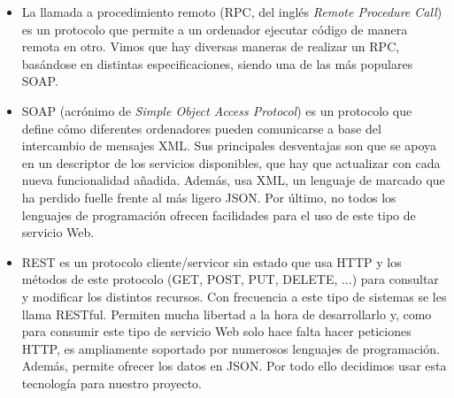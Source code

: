 \begin{itemize}
\item
La llamada a procedimiento remoto (RPC, del inglés \emph{Remote Procedure Call}) es un protocolo que permite a un ordenador ejecutar código de manera remota en otro. Vimos que hay diversas maneras de realizar un RPC, basándose en distintas especificaciones, siendo una de las más populares SOAP.

\item
SOAP (acrónimo de \emph{Simple Object Access Protocol}) es un protocolo que define cómo diferentes ordenadores pueden comunicarse a base del intercambio de mensajes XML. Sus principales desventajas son que se apoya en un descriptor de los servicios disponibles, que hay que actualizar con cada nueva funcionalidad añadida. Además, usa XML, un lenguaje de marcado que ha perdido fuelle frente al más ligero JSON. Por último, no todos los lenguajes de programación ofrecen facilidades para el uso de este tipo de servicio Web.

\item
REST es un protocolo cliente/servicor sin estado que usa HTTP y los métodos de este protocolo (GET, POST, PUT, DELETE, ...) para consultar y modificar los distintos recursos. Con frecuencia a este tipo de sistemas se les llama RESTful. Permiten mucha libertad a la hora de desarrollarlo y, como para consumir este tipo de servicio Web solo hace falta hacer peticiones HTTP, es ampliamente soportado por numerosos lenguajes de programación. Además, permite ofrecer los datos en JSON. Por todo ello decidimos usar esta tecnología para nuestro proyecto.

\end{itemize}